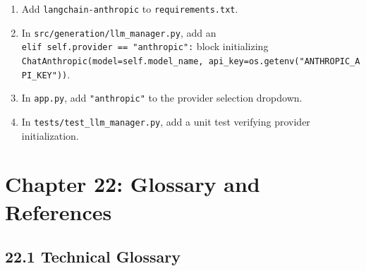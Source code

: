 \documentclass[
]{article}
\providecommand{\tightlist}{%
  \setlength{\itemsep}{0pt}\setlength{\parskip}{0pt}}
\begin{document}
\begin{enumerate}
\def\labelenumi{\arabic{enumi}.}
\tightlist
\item
  Add \texttt{langchain-anthropic} to \texttt{requirements.\allowbreak txt}.
\item
  In \texttt{src/\allowbreak generation/\allowbreak llm\_\allowbreak manager.\allowbreak py}, add an
  \texttt{elif\ \allowbreak self.\allowbreak provider\ \allowbreak =\allowbreak =\allowbreak \ \allowbreak "anthropic":} block initializing
  \texttt{ChatAnthropic(\allowbreak model=\allowbreak self.\allowbreak model\_\allowbreak name,\allowbreak \ \allowbreak api\_\allowbreak key=\allowbreak os.\allowbreak getenv(\allowbreak "ANTHROPIC\_\allowbreak API\_\allowbreak KEY")\allowbreak )\allowbreak }.
\item
  In \texttt{app.\allowbreak py}, add \texttt{"anthropic"} to the provider selection
  dropdown.
\item
  In \texttt{tests/\allowbreak test\_\allowbreak llm\_\allowbreak manager.\allowbreak py}, add a unit test verifying
  provider initialization.
\end{enumerate}

\section{Chapter 22: Glossary and
References}\label{chapter-22-glossary-and-references}

\subsection{22.1 Technical Glossary}\label{technical-glossary}
\end{document}
